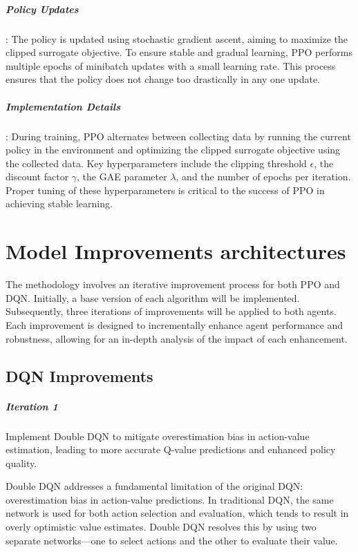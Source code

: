 \documentclass[
12pt, %
oneside, %
english, %
onehalfspacing, %
nolistspacing, %
liststotoc, %
headsepline, %
]{ProposalAndThesis} %
\begin{document}
\paragraph{Policy Updates}: The policy is updated using stochastic gradient ascent, aiming to maximize the clipped surrogate objective. To ensure stable and gradual learning, PPO performs multiple epochs of minibatch updates with a small learning rate. This process ensures that the policy does not change too drastically in any one update.

\paragraph{Implementation Details}: During training, PPO alternates between collecting data by running the current policy in the environment and optimizing the clipped surrogate objective using the collected data. Key hyperparameters include the clipping threshold \( \epsilon \), the discount factor \( \gamma \), the GAE parameter \( \lambda \), and the number of epochs per iteration. Proper tuning of these hyperparameters is critical to the success of PPO in achieving stable learning.



\chapter{Model Improvements architectures}
The methodology involves an iterative improvement process for both PPO and DQN. Initially, a base version of each algorithm will be implemented. Subsequently, three iterations of improvements will be applied to both agents. Each improvement is designed to incrementally enhance agent performance and robustness, allowing for an in-depth analysis of the impact of each enhancement.

\section{DQN Improvements}

\paragraph{Iteration 1} Implement Double DQN to mitigate overestimation bias in action-value estimation, leading to more accurate Q-value predictions and enhanced policy quality.

Double DQN addresses a fundamental limitation of the original DQN: overestimation bias in action-value predictions. In traditional DQN, the same network is used for both action selection and evaluation, which tends to result in overly optimistic value estimates. Double DQN resolves this by using two separate networks—one to select actions and the other to evaluate their value.
\end{document}
